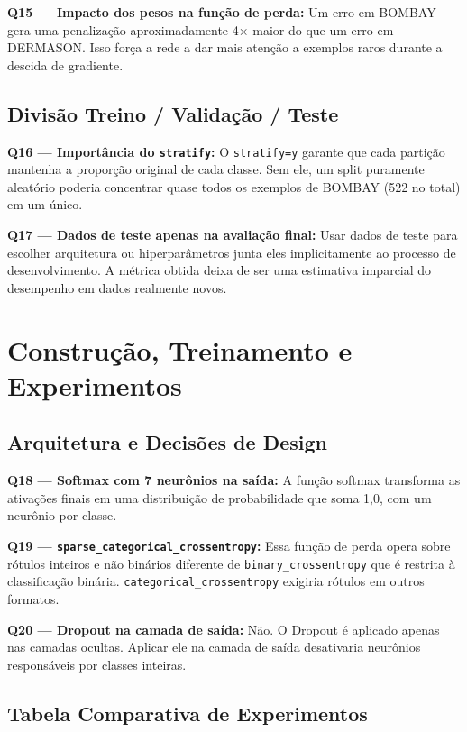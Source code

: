 \documentclass[12pt,a4paper]{article}
\begin{document}
\textbf{Q15 — Impacto dos pesos na função de perda:}
Um erro em BOMBAY gera uma penalização aproximadamente 4× maior do que um
erro em DERMASON.  Isso força a rede a dar mais atenção a exemplos raros
durante a descida de gradiente.

\subsection{Divisão Treino / Validação / Teste}

\textbf{Q16 — Importância do \texttt{stratify}:}
O \texttt{stratify=y} garante que cada partição mantenha a proporção original
de cada classe.  Sem ele, um split puramente aleatório poderia concentrar
quase todos os exemplos de BOMBAY (522 no total) em um único.

\textbf{Q17 — Dados de teste apenas na avaliação final:}
Usar dados de teste para escolher arquitetura ou hiperparâmetros junta eles
implicitamente ao processo de desenvolvimento.  A métrica obtida deixa de
ser uma estimativa imparcial do desempenho em dados realmente novos.

\section{Construção, Treinamento e Experimentos}

\subsection{Arquitetura e Decisões de Design}

\textbf{Q18 — Softmax com 7 neurônios na saída:}
A função softmax transforma as ativações finais em uma distribuição de
probabilidade que soma 1,0, com um neurônio por classe.

\textbf{Q19 — \texttt{sparse\_categorical\_crossentropy}:}
Essa função de perda opera sobre rótulos inteiros e não binários diferente de \texttt{binary\_crossentropy} que é restrita à classificação
binária. \texttt{categorical\_crossentropy} exigiria rótulos em outros formatos.

\textbf{Q20 — Dropout na camada de saída:}
Não.  O Dropout é aplicado apenas nas camadas ocultas.  Aplicar ele na camada
de saída desativaria neurônios responsáveis por classes inteiras.

\subsection{Tabela Comparativa de Experimentos}
\end{document}

